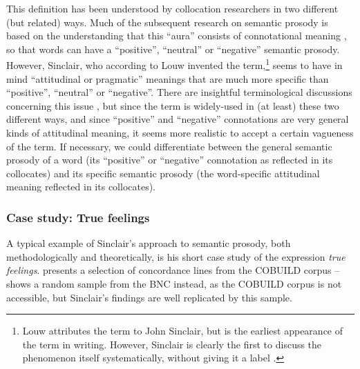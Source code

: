 This definition has been understood by collocation  researchers in two different (but related) ways. Much of the subsequent research on semantic  prosody is based on the understanding that this ``aura'' consists of connotational  meaning \citep[cf. e.g.][68]{partington_patterns_1998}, so that words can have a ``positive'', ``neutral'' or ``negative'' semantic prosody. However, Sinclair, who according to Louw invented the term,\footnote{Louw attributes the term to John Sinclair, but \citet{louw_irony_1993} is the earliest appearance of the term in writing. However, Sinclair is clearly the first to discuss the phenomenon itself systematically, without giving it a label \citep[e.g.][74--75]{sinclair_corpus_1991}.} seems to have in mind ``attitudinal or pragmatic''  meanings that are much more specific than ``positive'', ``neutral'' or ``negative''. There are insightful terminological discussions concerning this issue \citep[cf. e.g.][]{hunston_semantic_2007}, but since the term is widely\hyp{}used in (at least) these two different ways, and since ``positive'' and ``negative'' connotations  are very general kinds of attitudinal meaning, it seems more realistic to accept a certain vagueness of the term. If necessary, we could differentiate between the general semantic  prosody of a word (its ``positive'' or ``negative'' connotation as reflected in its collocates)  and its specific semantic prosody (the word\hyp{}specific attitudinal meaning reflected in its collocates).

\subsubsection{Case study: True feelings}
\label{sec:truefeelings}

A typical example of Sinclair's approach to semantic  prosody, both methodologically and theoretically, is his short case study of the expression \textit{true feelings}.  \citet{sinclair_search_1996} presents a selection of concordance  lines from the COBUILD corpus --  shows a random sample from the BNC  instead, as the COBUILD corpus is not accessible, but Sinclair's findings are well replicated  by this sample.

